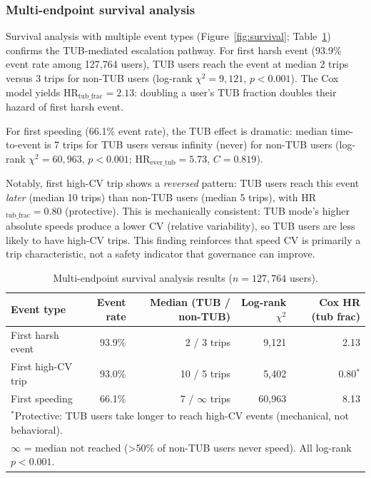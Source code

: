 \subsubsection{Multi-endpoint survival analysis}

Survival analysis with multiple event types (Figure~\ref{fig:survival}; Table~\ref{tab:survival}) confirms the TUB-mediated escalation pathway. For first harsh event (93.9\% event rate among 127,764 users), TUB users reach the event at median 2 trips versus 3 trips for non-TUB users (log-rank $\chi^2 = 9{,}121$, $p < 0.001$). The Cox model yields HR$_{\text{tub\_frac}} = 2.13$: doubling a user's TUB fraction doubles their hazard of first harsh event.

For first speeding (66.1\% event rate), the TUB effect is dramatic: median time-to-event is 7 trips for TUB users versus infinity (never) for non-TUB users (log-rank $\chi^2 = 60{,}963$, $p < 0.001$; HR$_{\text{ever\_tub}} = 5.73$, $C = 0.819$).

Notably, first high-CV trip shows a \textit{reversed} pattern: TUB users reach this event \textit{later} (median 10 trips) than non-TUB users (median 5 trips), with HR$_{\text{tub\_frac}} = 0.80$ (protective). This is mechanically consistent: TUB mode's higher absolute speeds produce a lower CV (relative variability), so TUB users are less likely to have high-CV trips. This finding reinforces that speed CV is primarily a trip characteristic, not a safety indicator that governance can improve.

\begin{table}[htbp]
\centering
\caption{Multi-endpoint survival analysis results ($n = 127{,}764$ users).}
\label{tab:survival}
\small
\begin{tabular}{lrrrr}
\toprule
\textbf{Event type} & \textbf{Event rate} & \textbf{Median (TUB / non-TUB)} & \textbf{Log-rank $\chi^2$} & \textbf{Cox HR (tub frac)} \\
\midrule
First harsh event & 93.9\% & 2 / 3 trips & 9,121 & 2.13 \\
First high-CV trip & 93.0\% & 10 / 5 trips & 5,402 & 0.80$^*$ \\
First speeding & 66.1\% & 7 / $\infty$ trips & 60,963 & 8.13 \\
\bottomrule
\multicolumn{5}{l}{\footnotesize $^*$Protective: TUB users take longer to reach high-CV events (mechanical, not behavioral).} \\
\multicolumn{5}{l}{\footnotesize $\infty$ = median not reached (>50\% of non-TUB users never speed). All log-rank $p < 0.001$.} \\
\end{tabular}
\end{table}
